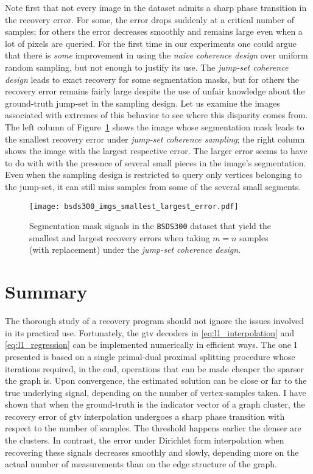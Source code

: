 Note first that not every image in the dataset admits a sharp phase transition in the recovery error. For some, the error drops suddenly at a critical number of samples; for others the error decreases smoothly and remains large even when a lot of pixels are queried. For the first time in our experiments one could argue that there is \emph{some} improvement in using the \emph{naive coherence design} over uniform random sampling, but not enough to justify its use. The \emph{jump-set coherence design} leads to exact recovery for some segmentation masks, but for others the recovery error remains fairly large despite the use of unfair knowledge about the ground-truth jump-set in the sampling design. Let us examine the images associated with extremes of this behavior to see where this disparity comes from. The left column of Figure~\ref{fig:bsds300_imgs_smallest_largest_error} shows the image whose segmentation mask leads to the smallest recovery error under \emph{jump-set coherence sampling}; the right column shows the image with the largest respective error. The larger error seems to have to do with with the presence of several small pieces in the image's segmentation. Even when the sampling design is restricted to query only vertices belonging to the jump-set, it can still miss samples from some of the several small segments.

\begin{figure}[H]
    \centering
    \texttt{[image: bsds300\_imgs\_smallest\_largest\_error.pdf]}
    \caption[Segmentation masks in \texttt{BSDS300} with the smallest and largest recovery errors]{Segmentation mask signals in the \texttt{BSDS300} dataset that yield the smallest and largest recovery errors when taking $m = n$ samples (with replacement) under the \emph{jump-set coherence design}.}
    \label{fig:bsds300_imgs_smallest_largest_error}
\end{figure}
\clearpage


\section{Summary}

The thorough study of a recovery program should not ignore the issues involved in its practical use. Fortunately, the \acrshort{gtv} decoders in \eqref{eq:l1_interpolation} and \eqref{eq:l1_regression} can be implemented numerically in efficient ways. The one I presented is based on a single primal-dual proximal splitting procedure whose iterations required, in the end, operations that can be made cheaper the sparser the graph is. Upon convergence, the estimated solution can be close or far to the true underlying signal, depending on the number of vertex-samples taken. I have shown that when the ground-truth is the indicator vector of a graph cluster, the recovery error of \acrshort{gtv} interpolation undergoes a sharp phase transition with respect to the number of samples. The threshold happens earlier the denser are the clusters. In contrast, the error under Dirichlet form interpolation when recovering these signals decreases smoothly and slowly, depending more on the actual number of measurements than on the edge structure of the graph.

